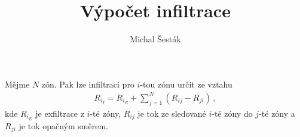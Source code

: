 \documentclass[11pt,a4paper]{article}
\author{Michal Šesták}
\title{Výpočet infiltrace}
\begin{document}
\maketitle
Mějme $N$ zón. Pak lze infiltraci pro $i$-tou zónu určit ze vztahu
\begin{align}
	R_{i_I}=R_{i_E}+\sum_{j=1}^{N} \left(R_{ij}-R_{ji}\right)\,,
\end{align}
kde $R_{i_E}$ je exfiltrace z $i$-té zóny, $R_{ij}$ je tok ze sledované $i$-té zóny do $j$-té zóny a $R_{ji}$ je tok opačným směrem.
\end{document}
